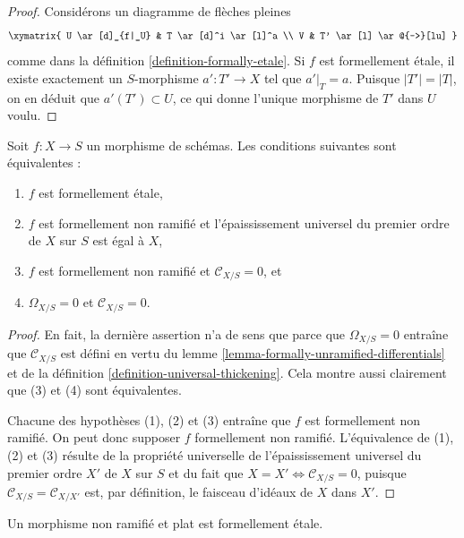 \begin{proof}
Considérons un diagramme de flèches pleines
$$
\xymatrix{
U \ar[d]_{f|_U} & T \ar[d]^i \ar[l]^a \\
V & T' \ar[l] \ar@{-->}[lu]
}
$$
comme dans la définition \ref{definition-formally-etale}. Si $f$ est formellement
étale, il existe exactement un $S$-morphisme $a' : T' \to X$
tel que $a'|_T = a$. Puisque $|T'| = |T|$, on en déduit que $a'(T') \subset U$,
ce qui donne l'unique morphisme de $T'$ dans $U$ voulu.
\end{proof}

\begin{lemma}
\label{lemma-characterize-formally-etale}
Soit $f : X \to S$ un morphisme de schémas.
Les conditions suivantes sont équivalentes :
\begin{enumerate}
\item $f$ est formellement étale,
\item $f$ est formellement non ramifié et l'épaississement universel du premier ordre
de $X$ sur $S$ est égal à $X$,
\item $f$ est formellement non ramifié et $\mathcal{C}_{X/S} = 0$, et
\item $\Omega_{X/S} = 0$ et $\mathcal{C}_{X/S} = 0$.
\end{enumerate}
\end{lemma}

\begin{proof}
En fait, la dernière assertion n'a de sens que parce que $\Omega_{X/S} = 0$
entraîne que $\mathcal{C}_{X/S}$ est défini en vertu du
lemme \ref{lemma-formally-unramified-differentials}
et de
la définition \ref{definition-universal-thickening}.
Cela montre aussi clairement que (3) et (4) sont équivalentes.

\medskip\noindent
Chacune des hypothèses (1), (2) et (3) entraîne que $f$ est formellement
non ramifié. On peut donc supposer $f$ formellement non ramifié. L'équivalence
de (1), (2) et (3) résulte de la propriété universelle de l'épaississement universel
du premier ordre $X'$ de $X$ sur $S$ et du fait que
$X = X' \Leftrightarrow \mathcal{C}_{X/S} = 0$, puisque
$\mathcal{C}_{X/S} = \mathcal{C}_{X/X'}$ est, par définition,
le faisceau d'idéaux de $X$ dans $X'$.
\end{proof}

\begin{lemma}
\label{lemma-unramified-flat-formally-etale}
Un morphisme non ramifié et plat est formellement étale.
\end{lemma}

